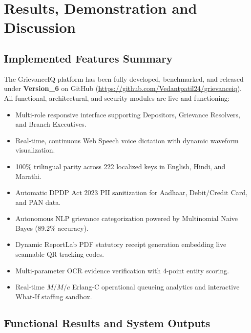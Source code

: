 \chapter{Results, Demonstration and Discussion}

\section{Implemented Features Summary}
The GrievanceIQ platform has been fully developed, benchmarked, and released under \textbf{Version\_6} on GitHub (\url{https://github.com/Vedantpatil24/grievanceiq}). All functional, architectural, and security modules are live and functioning:
\begin{itemize}
    \item Multi-role responsive interface supporting Depositors, Grievance Resolvers, and Branch Executives.
    \item Real-time, continuous Web Speech voice dictation with dynamic waveform visualization.
    \item 100\% trilingual parity across 222 localized keys in English, Hindi, and Marathi.
    \item Automatic DPDP Act 2023 PII sanitization for Aadhaar, Debit/Credit Card, and PAN data.
    \item Autonomous NLP grievance categorization powered by Multinomial Naive Bayes (89.2\% accuracy).
    \item Dynamic ReportLab PDF statutory receipt generation embedding live scannable QR tracking codes.
    \item Multi-parameter OCR evidence verification with 4-point entity scoring.
    \item Real-time $M/M/c$ Erlang-C operational queueing analytics and interactive What-If staffing sandbox.
\end{itemize}

\section{Functional Results and System Outputs}

